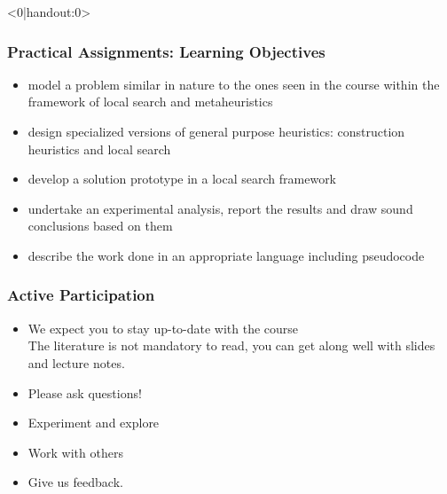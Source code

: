\documentclass[handout,usepdftitle=false,aspectratio=169,smaller,compress,sans,fleqn,xcolor=dvipsnames,fleqn,table]{beamer}
\begin{document}
\begin{frame}<0|handout:0>%
  \frametitle{Practical Assignments: Learning Objectives}


\medskip
\begin{itemize}
  \itemsep=2ex
\item \alert{model} a problem similar in nature to the ones seen in the course
  within the framework of local search and metaheuristics
\item \alert{design} specialized versions of general purpose heuristics:
  construction heuristics and local search
\item \alert{develop} a solution prototype in a local search framework
\item \alert{undertake an experimental analysis}, report the results and draw
  sound conclusions based on them
\item \alert{describe} the work done in an appropriate language including pseudocode
\end{itemize}


  \end{frame}






\begin{frame}%
  \frametitle{Active Participation}

  \medskip\begin{itemize}\itemsep=3ex
  \item We expect you to stay up-to-date with the course\\
The literature is not mandatory to read, you can get along well with
slides and lecture notes.
    \item Please ask questions!
    \item Experiment and explore
    \item Work with others
    \item Give us feedback.
    \end{itemize}
  \end{frame}
\end{document}
